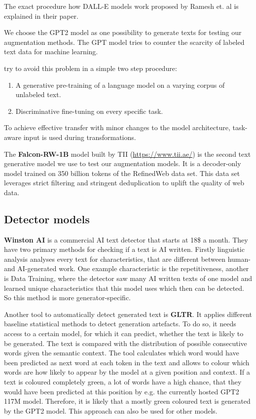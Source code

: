 \documentclass{article} %
\begin{document}
The exact procedure how DALL-E models work proposed by Ramesh et. al is explained in their paper. \cite{ramesh2021zeroshot}

We choose the GPT2 model as one possibility to generate texts for testing our augmentation methods. The GPT model tries to counter the scarcity of labeled text data for machine learning. 

\cite{radford2018improving} try to avoid this problem in a simple two step procedure:
\begin{enumerate}
	\item A generative pre-training of a language model on a varying corpus of unlabeled text.
	\item Discriminative fine-tuning on every specific task.
\end{enumerate}

To achieve effective transfer with minor changes to the model architecture, task-aware input is used during transformations. \cite{radford2018improving}

The \textbf{Falcon-RW-1B} model built by TII (\url{https://www.tii.ae/}) is the second text generative model we use to test our augmentation models. It is a decoder-only model trained on 350 billion tokens of the RefinedWeb data set. This data set leverages strict filtering and stringent deduplication to uplift the quality of web data. \cite{penedo2023refinedweb}

\subsection{Detector models}

\textbf{Winston AI} is a commercial AI text detector that starts at 18\$ a month. They have two primary methods for checking if a text is AI written. Firstly linguistic analysis analyses every text for characteristics, that are different between human- and AI-generated work. One example characteristic is the repetitiveness, another is Data Training, where the detector saw many AI written texts of one model and learned unique characteristics that this model uses which then can be detected. So this method is more generator-specific. \cite{WinstonAI}

Another tool to automatically detect generated text is \textbf{GLTR}. It applies different baseline statistical methods to detect generation artefacts. To do so, it needs access to a certain model, for which it can predict, whether the text is likely to be generated. The text is compared with the distribution of possible consecutive words given the semantic context. The tool calculates which word would have been predicted as next word at each token in the text and allows to colour which words are how likely to appear by the model at a given position and context. If a text is coloured completely green, a lot of words have a high chance, that they would have been predicted at this position by e.g. the currently hosted GPT2 117M model. Therefore, it is likely that a mostly green coloured text is generated by the GPT2 model. This approach can also be used for other models. \cite{gehrmann2019gltr}
\end{document}
